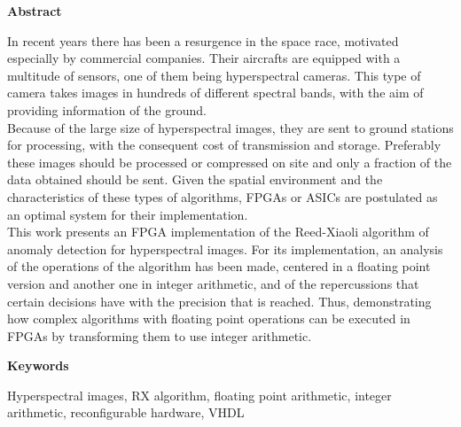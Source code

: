 
\newpage

\thispagestyle{empty}

\begin{center}

{\bf \Huge Abstract}

  \end{center}
\vspace{1cm}
In recent years there has been a resurgence in the space race, motivated especially by commercial companies. Their aircrafts are equipped with a multitude of sensors, one of them being hyperspectral cameras. This type of camera takes images in hundreds of different spectral bands, with the aim of providing information of the ground.
\\
Because of the large size of hyperspectral images, they are sent to ground stations for processing, with the consequent cost of transmission and storage. Preferably these images should be processed or compressed on site and only a fraction of the data obtained should be sent. Given the spatial environment and the characteristics of these types of algorithms, FPGAs or ASICs are postulated as an optimal system for their implementation.
\\
This work presents an FPGA implementation of the Reed-Xiaoli algorithm of anomaly detection for hyperspectral images. For its implementation, an analysis of the operations of the algorithm has been made, centered in a floating point version and another one in integer arithmetic, and of the repercussions that certain decisions have with the precision that is reached.
Thus, demonstrating how complex algorithms with floating point operations can be executed in FPGAs by transforming them to use integer arithmetic.

\vspace{1cm}

\begin{center}

{\bf \Large Keywords}

   \end{center}

   \vspace{0.5cm}
   
   Hyperspectral images, RX algorithm, floating point arithmetic, integer arithmetic, reconfigurable hardware, VHDL
   


